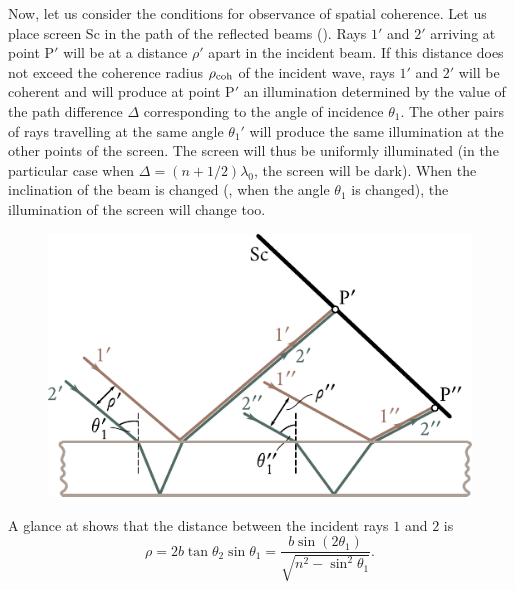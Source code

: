Now, let us consider the conditions for observance of spatial coherence.
Let us place screen Sc in the path of the reflected beams ().
Rays $1'$ and $2'$ arriving at point P$'$ will be at a distance $\rho'$ apart in the incident beam.
If this distance does not exceed the coherence radius $\rho_{\text{coh}}$ of the incident wave, rays $1'$ and $2'$ will be coherent and will produce at point P$'$ an illumination determined by the value of the path difference $\Delta$ corresponding to the angle of incidence $\theta_1$.
The other pairs of rays travelling at the same angle $\theta_1'$ will produce the same illumination at the other points of the screen.
The screen will thus be uniformly illuminated (in the particular case when $\Delta=(n+1/2)\lambda_0$, the screen will be dark).
When the inclination of the beam is changed (\ie, when the angle $\theta_1$ is changed), the illumination of the screen will change too.

\begin{figure}[t]
	\begin{center}
		\includegraphics[scale=1]{figures/ch_17/fig_17_11.pdf}
		\caption[]{}
		\label{fig:17_11}
	\end{center}
	\vspace{-0.8cm}
\end{figure}

A glance at  shows that the distance between the incident rays $1$ and $2$ is
\begin{equation}\label{eq:17_37}
    \rho = 2b\tan\theta_2\sin\theta_1 = \frac{b \sin(2\theta_1)}{\sqrt{n^2 - \sin^2\theta_1}}.
\end{equation}

